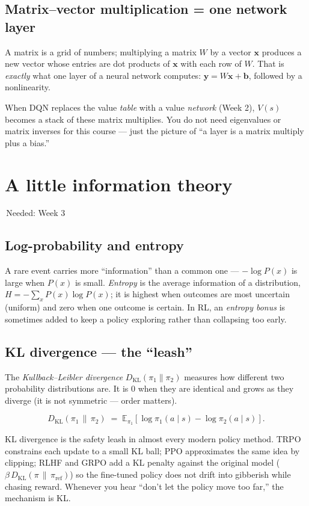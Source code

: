 \documentclass[11pt]{article}
\newcommand{\wk}[1]{{\sffamily\footnotesize\colorbox{slate!12}{\textcolor{slate}{\,Needed: #1\,}}}}
\begin{document}
\subsection{Matrix–vector multiplication = one network layer}
\begin{intuition}
A matrix is a grid of numbers; multiplying a matrix $W$ by a vector $\mathbf{x}$ produces a new vector whose entries are dot products of $\mathbf{x}$ with each row of $W$. That is \emph{exactly} what one layer of a neural network computes: $\mathbf{y} = W\mathbf{x} + \mathbf{b}$, followed by a nonlinearity.
\end{intuition}
\begin{why}
When DQN replaces the value \emph{table} with a value \emph{network} (Week 2), $V(s)$ becomes a stack of these matrix multiplies. You do not need eigenvalues or matrix inverses for this course — just the picture of ``a layer is a matrix multiply plus a bias.''
\end{why}

\section{A little information theory}
\wk{Week 3}

\subsection{Log-probability and entropy}
\begin{intuition}
A rare event carries more ``information'' than a common one — $-\log P(x)$ is large when $P(x)$ is small. \emph{Entropy} is the average information of a distribution, $H = -\sum_x P(x)\log P(x)$; it is highest when outcomes are most uncertain (uniform) and zero when one outcome is certain. In RL, an \emph{entropy bonus} is sometimes added to keep a policy exploring rather than collapsing too early.
\end{intuition}

\subsection{KL divergence — the ``leash''}
\begin{intuition}
The \emph{Kullback–Leibler divergence} $D_{\mathrm{KL}}(\pi_1 \| \pi_2)$ measures how different two probability distributions are. It is $0$ when they are identical and grows as they diverge (it is not symmetric — order matters).
\end{intuition}
\[
D_{\mathrm{KL}}(\pi_1 \,\|\, \pi_2) \;=\; \mathbb{E}_{\pi_1}\!\left[\log \pi_1(a\mid s) - \log \pi_2(a\mid s)\right].
\]
\begin{why}
KL divergence is the safety leash in almost every modern policy method. TRPO constrains each update to a small KL ball; PPO approximates the same idea by clipping; RLHF and GRPO add a KL penalty against the original model ($\beta\, D_{\mathrm{KL}}(\pi \,\|\, \pi_{\text{ref}})$) so the fine-tuned policy does not drift into gibberish while chasing reward. Whenever you hear ``don't let the policy move too far,'' the mechanism is KL.
\end{why}
\end{document}
